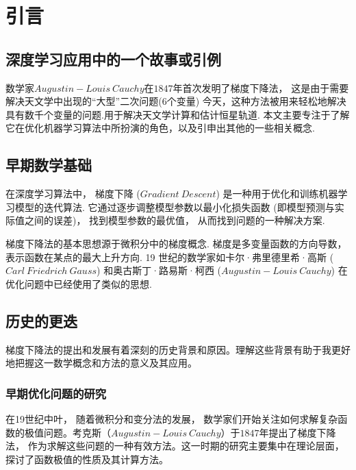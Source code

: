 \documentclass[printMode=false, declarePage=false]{ecnuthesis}
\begin{document}
    \mainmatter

    \chapter{引言}


    \section{深度学习应用中的一个故事或引例}

    数学家$Augustin-Louis\ Cauchy$在$1847$年首次发明了梯度下降法\cite{lemarechal2012cauchy}，
    这是由于需要解决天文学中出现的“大型”二次问题($6$个变量)
    今天，这种方法被用来轻松地解决具有数千个变量的问题.用于解决天文学计算和估计恒星轨道.\cite{coursera2024gradientdescent}
    本文主要专注于了解它在优化机器学习算法中所扮演的角色，以及引申出其他的一些相关概念.

    \section{早期数学基础}

    在深度学习算法中， 梯度下降 ($Gradient\ Descent$) 是一种用于优化和训练机器学习模型的迭代算法.
    它通过逐步调整模型参数以最小化损失函数 (即模型预测与实际值之间的误差)， 找到模型参数的最优值，
    从而找到问题的一种解决方案.

    梯度下降法的基本思想源于微积分中的梯度概念.
    梯度是多变量函数的方向导数， 表示函数在某点的最大上升方向.
    19 世纪的数学家如卡尔·弗里德里希·高斯 ($Carl\ Friedrich\ Gauss$) 和奥古斯丁·路易斯·柯西 ($Augustin-Louis\ Cauchy$) 在优化问题中已经使用了类似的思想.

    \section{历史的更迭}

    梯度下降法的提出和发展有着深刻的历史背景和原因。理解这些背景有助于我更好地把握这一数学概念和方法的意义及其应用。

    \subsection{早期优化问题的研究}
    在19世纪中叶， 随着微积分和变分法的发展， 数学家们开始关注如何求解复杂函数的极值问题。考克斯（$Augustin-Louis\ Cauchy$）于$1847$年提出了梯度下降法， 作为求解这些问题的一种有效方法。这一时期的研究主要集中在理论层面， 探讨了函数极值的性质及其计算方法。
\end{document}
